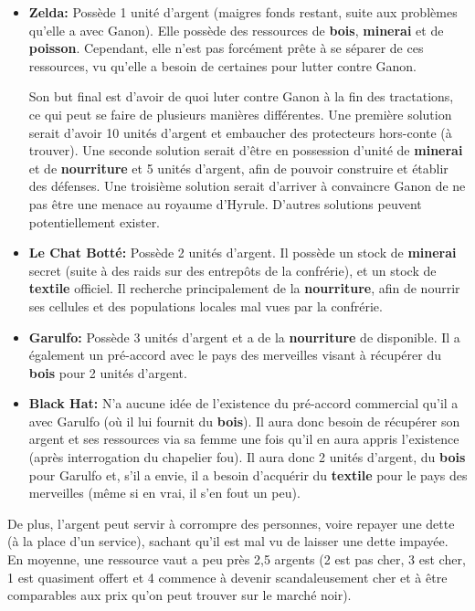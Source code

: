 {\begin{itemize}
		\item \textbf{Zelda:} Possède 1 unité d'argent (maigres fonds restant, suite aux problèmes qu'elle a avec Ganon). Elle possède des ressources de \textbf{bois}, \textbf{minerai} et de \textbf{poisson}. Cependant, elle n'est pas forcément prête à se séparer de ces ressources, vu qu'elle a besoin de certaines pour lutter contre Ganon.
		
		Son but final est d'avoir de quoi luter contre Ganon à la fin des tractations, ce qui peut se faire de plusieurs manières différentes. Une première solution serait d'avoir 10 unités d'argent et embaucher des protecteurs hors-conte (à trouver). Une seconde solution serait d'être en possession d'unité de \textbf{minerai} et de \textbf{nourriture} et 5 unités d'argent, afin de pouvoir construire et établir des défenses. Une troisième solution serait d'arriver à convaincre Ganon de ne pas être une menace au royaume d'Hyrule. D'autres solutions peuvent potentiellement exister.
		
		\item \textbf{Le Chat Botté:} Possède 2 unités d'argent. Il possède un stock de \textbf{minerai} secret (suite à des raids sur des entrepôts de la confrérie), et un stock de \textbf{textile} officiel. Il recherche principalement de la \textbf{nourriture}, afin de nourrir ses cellules et des populations locales mal vues par la confrérie.
		
		\item \textbf{Garulfo:} Possède 3 unités d'argent et a de la \textbf{nourriture} de disponible. Il a également un pré-accord avec le pays des merveilles visant à récupérer du \textbf{bois} pour 2 unités d'argent.
		
		\item \textbf{Black Hat:} N'a aucune idée de l'existence du pré-accord commercial qu'il a avec Garulfo (où il lui fournit du \textbf{bois}). Il aura donc besoin de récupérer son argent et ses ressources via sa femme une fois qu'il en aura appris l'existence (après interrogation du chapelier fou). Il aura donc 2 unités d'argent, du \textbf{bois} pour Garulfo et, s'il a envie, il a besoin d'acquérir du \textbf{textile} pour le pays des merveilles (même si en vrai, il s'en fout un peu).
	\end{itemize}
	
	\par De plus, l'argent peut servir à corrompre des personnes, voire repayer une dette (à la place d'un service), sachant qu'il est mal vu de laisser une dette impayée. En moyenne, une ressource vaut a peu près 2,5 argents (2 est pas cher, 3 est cher, 1 est quasiment offert et 4 commence à devenir scandaleusement cher et à être comparables aux prix qu'on peut trouver sur le marché noir).
	
}
